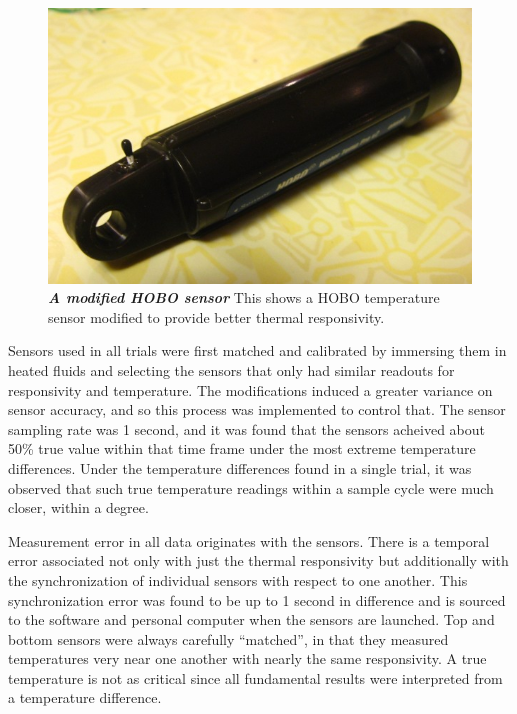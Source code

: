 \documentclass[12pt]{article}
\numberwithin{equation}{section}
\numberwithin{table}{section}
\numberwithin{figure}{section}
\begin{document}
\begin{center}
\begin{figure} [h!]
 \centering\includegraphics[scale=0.8]{modSensor.jpg}
 \caption[Modified HOBO Sensor]{\textbf{\emph{A modified HOBO sensor}} This shows a HOBO temperature sensor modified to provide better thermal responsivity.\label{modSens}}
\end{figure}
\end{center}

Sensors used in all trials were first matched and calibrated by immersing them in heated fluids and selecting the sensors that only had similar readouts for responsivity and temperature. The modifications induced a greater variance on sensor accuracy, and so this process was implemented to control that. The sensor sampling rate was 1 second, and it was found that the sensors acheived about 50\% true value within that time frame under the most extreme temperature differences. Under the temperature differences found in a single trial, it was observed that such true temperature readings within a sample cycle were much closer, within a degree. 

Measurement error in all data originates with the sensors. There is a temporal error associated not only with just the thermal responsivity but additionally with the synchronization of individual sensors with respect to one another. This synchronization error was found to be up to 1 second in difference and is sourced to the software and personal computer when the sensors are launched. Top and bottom sensors were always carefully ``matched'', in that they measured temperatures very near one another with nearly the same responsivity. A true temperature is not as critical since all fundamental results were interpreted from a temperature difference.
\end{document}
